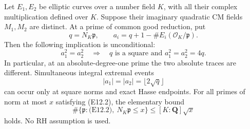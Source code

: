 Let \(E_1,E_2\) be elliptic curves over a number field \(K\),
with all their complex multiplication defined over \(K\).
Suppose their imaginary quadratic CM fields \(M_1,M_2\)
are distinct. At a prime of common good reduction, put
\[
 q=N_K\mathfrak p,\qquad
 a_i=q+1-\#E_i(\mathcal O_K/\mathfrak p).
 \]
Then the following implication is unconditional:
\[
            a_1^2=a_2^2
       \quad\Longrightarrow\quad
       q\text{ is a square and }a_1^2=a_2^2=4q.
                                                               \tag{E12.1}
\]
In particular, at an absolute-degree-one prime the two
absolute traces are different. Simultaneous integral
extremal events
\[
            |a_1|=|a_2|=\lfloor2\sqrt q\rfloor
                                                               \tag{E12.2}
\]
can occur only at square norms and exact Hasse endpoints.
For all primes of norm at most \(x\) satisfying (E12.2),
the elementary bound
\[
        \#\{\mathfrak p:\text{(E12.2)},\ N_K\mathfrak p\le x\}
                              \le [K:\mathbf Q]\sqrt x
                                                               \tag{E12.3}
\]
holds. No RH assumption is used.

